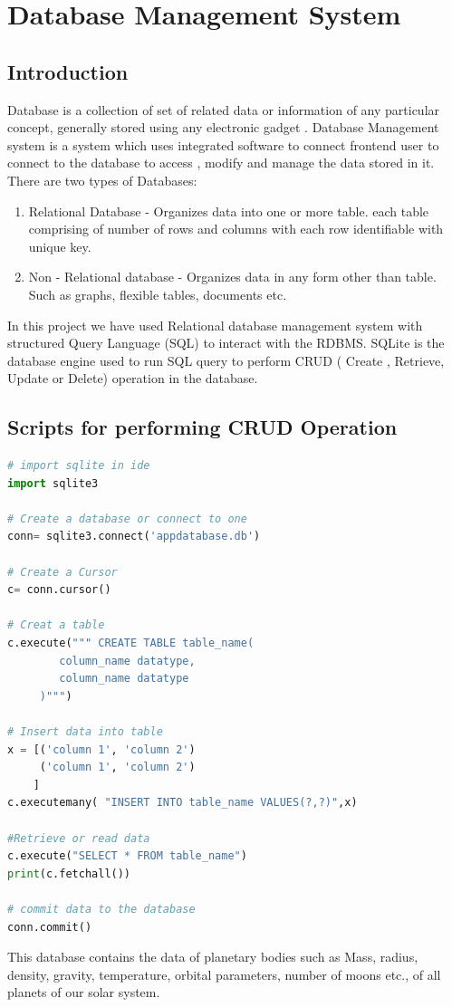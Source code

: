 \documentclass[12pt]{article}
\begin{document}
\section{Database Management System}
\subsection{Introduction}
Database is a collection of set of related data or information of any particular concept, generally stored using any electronic gadget . Database Management system is a system which uses integrated software to connect frontend user to connect to the database to access , modify and manage the data stored in it.  
There are two types of Databases:
\begin{enumerate}
\item Relational Database - Organizes data into one or more table. each table comprising of number of rows and columns  with each row identifiable with unique key.
\item Non - Relational database - Organizes data in any form other than table. Such as graphs, flexible tables, documents etc.
\end{enumerate}
In this project we have used Relational database management system with structured Query Language (SQL) to interact with the RDBMS. SQLite is the database engine used to run SQL query to perform CRUD ( Create , Retrieve, Update or Delete) operation in the database.

\subsection{Scripts for performing CRUD Operation}
\begin{lstlisting}[language=python, caption=Script file for performing CRUD Operation]
# import sqlite in ide 
import sqlite3

# Create a database or connect to one 
conn= sqlite3.connect('appdatabase.db')

# Create a Cursor
c= conn.cursor()

# Creat a table
c.execute(""" CREATE TABLE table_name( 
        column_name datatype,
        column_name datatype
     )""")

# Insert data into table
x = [('column 1', 'column 2')
     ('column 1', 'column 2')
    ]
c.executemany( "INSERT INTO table_name VALUES(?,?)",x)

#Retrieve or read data 
c.execute("SELECT * FROM table_name")
print(c.fetchall())

# commit data to the database
conn.commit()
\end{lstlisting}
This database contains the data of planetary bodies such as Mass, radius, density, gravity, temperature, orbital parameters, number of moons etc., of all planets of our solar system.
\end{document}
